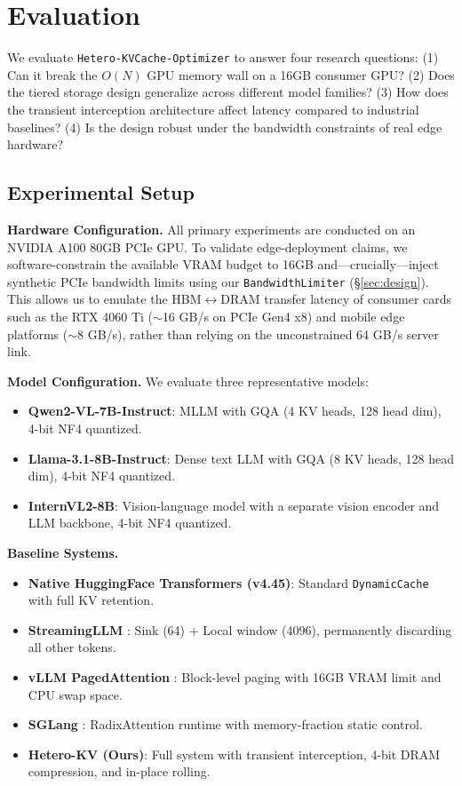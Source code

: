 \section{Evaluation}
\label{sec:evaluation}

We evaluate \texttt{Hetero-KVCache-Optimizer} to answer four research questions:
(1) Can it break the $O(N)$ GPU memory wall on a 16GB consumer GPU?
(2) Does the tiered storage design generalize across different model families?
(3) How does the transient interception architecture affect latency compared to industrial baselines?
(4) Is the design robust under the bandwidth constraints of real edge hardware?

\subsection{Experimental Setup}

\textbf{Hardware Configuration.} All primary experiments are conducted on an NVIDIA A100 80GB PCIe GPU. To validate edge-deployment claims, we software-constrain the available VRAM budget to 16GB and---crucially---inject synthetic PCIe bandwidth limits using our \texttt{BandwidthLimiter} (\S\ref{sec:design}). This allows us to emulate the HBM$\leftrightarrow$DRAM transfer latency of consumer cards such as the RTX 4060 Ti ($\sim$16 GB/s on PCIe Gen4 x8) and mobile edge platforms ($\sim$8 GB/s), rather than relying on the unconstrained 64 GB/s server link.

\textbf{Model Configuration.} We evaluate three representative models:
\begin{itemize}
    \item \textbf{Qwen2-VL-7B-Instruct}: MLLM with GQA (4 KV heads, 128 head dim), 4-bit NF4 quantized.
    \item \textbf{Llama-3.1-8B-Instruct}: Dense text LLM with GQA (8 KV heads, 128 head dim), 4-bit NF4 quantized.
    \item \textbf{InternVL2-8B}: Vision-language model with a separate vision encoder and LLM backbone, 4-bit NF4 quantized.
\end{itemize}

\textbf{Baseline Systems.}
\begin{itemize}
    \item \textbf{Native HuggingFace Transformers (v4.45)}: Standard \texttt{DynamicCache} with full KV retention.
    \item \textbf{StreamingLLM} \cite{xiao2023streamingllm}: Sink (64) + Local window (4096), permanently discarding all other tokens.
    \item \textbf{vLLM PagedAttention} \cite{kwon2023efficient}: Block-level paging with 16GB VRAM limit and CPU swap space.
    \item \textbf{SGLang} \cite{zheng2023efficiently}: RadixAttention runtime with memory-fraction static control.
    \item \textbf{Hetero-KV (Ours)}: Full system with transient interception, 4-bit DRAM compression, and in-place rolling.
\end{itemize}


